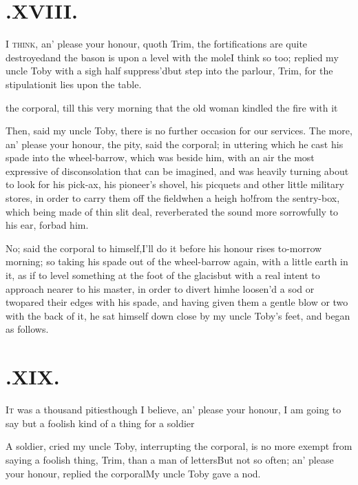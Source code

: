 \documentclass{article}
\begin{document}
\medskip

\section{.\enspace XVIII.}

\lettrine{I}{ think}, an’ please your
honour, quoth Trim, the fortifications are quite
destroyed\tsh and the bason is upon a level with the
mole\tsh I think so too; replied my uncle Toby with
a sigh half suppress’d\tsh but step into the
parlour, Trim, for the stipulation\tsh it lies upon
the table.

\noindent
{}
the corporal, till
this very morning that the old woman kindled the fire with
it\tsk

\tsk Then, said my uncle Toby, there is no
further occasion for our services. The more, an’ please your
honour, the pity, said the corporal; in uttering which he cast his
spade into the wheel-barrow, which was beside him, with an air the
most expressive of disconsolation that can be imagined, and was
heavily turning about to look for his pick-ax, his pio\-neer’s
shovel, his picquets and other little military stores, in order to
carry them off the field\tsh when a heigh ho!\@ from the
sentry-box, which being made of thin slit deal, reverberated the
sound more sorrowfully to his ear, forbad him.

\tsk No; said the corporal to himself,\break I’ll do it
before his honour rises to-mor\-row morning; so taking his spade out
of the wheel-barrow again, with a little earth in it, as if to
level something at the foot of the glacis\tsh but with a
real intent to approach nearer to his master, in order to divert
him\tsh he loosen’d a sod or two\tsh pared
their edges with his spade, and having given them a gentle blow or
two with the back of it, he sat himself down close by my uncle
Toby’s feet, and began as follows.

\vfill{}\eject\null\smallskip
\section{.\enspace XIX.}

\lettrine{I}{t} was a thousand
pities\tsh though I believe, an’ please your honour,
I am going to say but a foolish kind of a thing for a
soldier\tsh

A soldier, cried my uncle Toby, interrupting the
corporal, is no more exempt from saying a foolish thing, Trim, than a man
of letters\tsh But not so often; an’ please your
honour, replied the corporal\tsh My uncle Toby gave
a nod.
\end{document}
